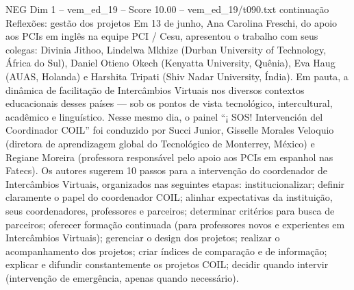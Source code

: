 \begin{textsample}{NEG Dim 1 – vem\_ed\_19 – Score 10.00 – vem\_ed\_19/t090.txt}  \label{ex:f1_neg_139}
continuação Reflexões: gestão dos projetos Em 13 de junho, Ana Carolina Freschi, do apoio aos PCIs em inglês na equipe PCI / Cesu, apresentou o trabalho com seus colegas: Divinia Jithoo, Lindelwa Mkhize (Durban University of Technology, África do Sul), Daniel Otieno Okech (Kenyatta University, Quênia), Eva Haug (AUAS, Holanda) e Harshita Tripati (Shiv Nadar University, Índia).
Em pauta, a dinâmica de facilitação de Intercâmbios Virtuais nos diversos contextos educacionais desses países — sob os pontos de vista tecnológico, intercultural, acadêmico e linguístico.
Nesse mesmo dia, o painel “¡ SOS!
Intervención del Coordinador COIL” foi conduzido por Succi Junior, Gisselle Morales Veloquio (diretora de aprendizagem global do Tecnológico de Monterrey, México) e Regiane Moreira (professora responsável pelo apoio aos PCIs em espanhol nas Fatecs).
Os autores sugerem 10 passos para a intervenção do coordenador de Intercâmbios Virtuais, organizados nas seguintes etapas: institucionalizar; definir claramente o papel do coordenador COIL; alinhar expectativas da instituição, seus coordenadores, professores e parceiros; determinar critérios para busca de parceiros; oferecer formação continuada (para professores novos e experientes em Intercâmbios Virtuais); gerenciar o design dos projetos; realizar o acompanhamento dos projetos; criar índices de comparação e de informação; explicar e difundir constantemente os projetos COIL; decidir quando intervir (intervenção de emergência, apenas quando necessário).

\end{textsample}
